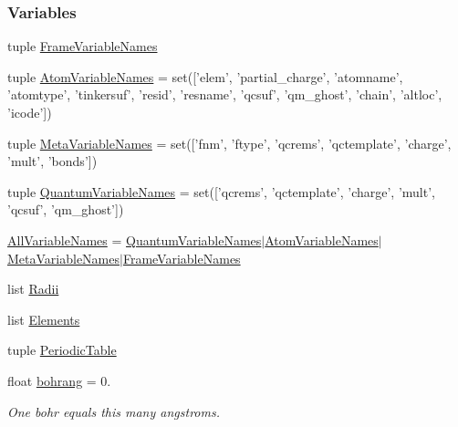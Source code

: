 \subsubsection*{Variables}
\begin{DoxyCompactItemize}
\item 
tuple \hyperlink{namespaceforcebalance_1_1molecule_a0044fa397e0923635a8b3e9625aa70f7}{Frame\-Variable\-Names}
\item 
tuple \hyperlink{namespaceforcebalance_1_1molecule_a5daa68e835dcb9877d6c3f2fb559b54b}{Atom\-Variable\-Names} = set(\mbox{[}'elem', 'partial\-\_\-charge', 'atomname', 'atomtype', 'tinkersuf', 'resid', 'resname', 'qcsuf', 'qm\-\_\-ghost', 'chain', 'altloc', 'icode'\mbox{]})
\item 
tuple \hyperlink{namespaceforcebalance_1_1molecule_a38e1c99e9567fe42b792af43db9b7488}{Meta\-Variable\-Names} = set(\mbox{[}'fnm', 'ftype', 'qcrems', 'qctemplate', 'charge', 'mult', 'bonds'\mbox{]})
\item 
tuple \hyperlink{namespaceforcebalance_1_1molecule_ab67efeab6049ec1f416b9ad1eed6ffcc}{Quantum\-Variable\-Names} = set(\mbox{[}'qcrems', 'qctemplate', 'charge', 'mult', 'qcsuf', 'qm\-\_\-ghost'\mbox{]})
\item 
\hyperlink{namespaceforcebalance_1_1molecule_a8fcfb88fe12a9256b61980f3d4fe3b63}{All\-Variable\-Names} = \hyperlink{namespaceforcebalance_1_1molecule_ab67efeab6049ec1f416b9ad1eed6ffcc}{Quantum\-Variable\-Names}$|$\hyperlink{namespaceforcebalance_1_1molecule_a5daa68e835dcb9877d6c3f2fb559b54b}{Atom\-Variable\-Names}$|$\hyperlink{namespaceforcebalance_1_1molecule_a38e1c99e9567fe42b792af43db9b7488}{Meta\-Variable\-Names}$|$\hyperlink{namespaceforcebalance_1_1molecule_a0044fa397e0923635a8b3e9625aa70f7}{Frame\-Variable\-Names}
\item 
list \hyperlink{namespaceforcebalance_1_1molecule_a74f55a89a14ca676b5a06441d1fdab19}{Radii}
\item 
list \hyperlink{namespaceforcebalance_1_1molecule_a1c99a11e8a749468698c9af6361a8a4c}{Elements}
\item 
tuple \hyperlink{namespaceforcebalance_1_1molecule_adc5040ec456762f2ac240fb08febbfdd}{Periodic\-Table}
\item 
float \hyperlink{namespaceforcebalance_1_1molecule_a76af9edfbaaa8999680e32aafe1b1b61}{bohrang} = 0.
\begin{DoxyCompactList}\small\item\em One bohr equals this many angstroms. \end{DoxyCompactList}\item 

\end{DoxyCompactItemize}
